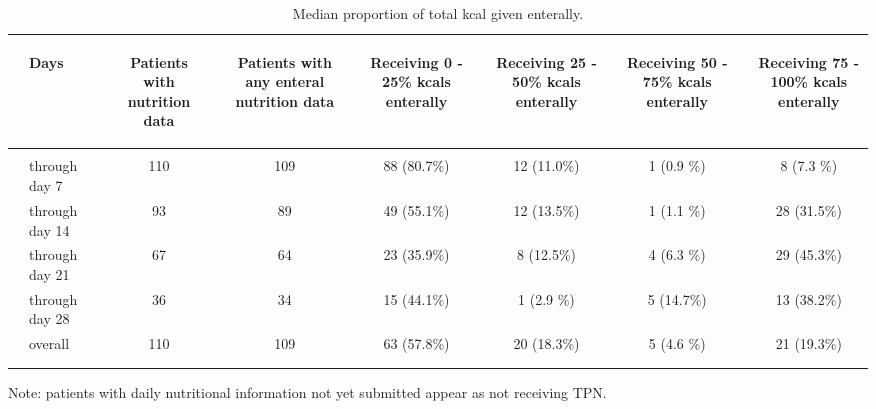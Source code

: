 \documentclass[dvips,10pt]{article}
\begin{document}
\begin{table}[t]
\caption
{ Median proportion of total kcal given enterally. }
\begin{center}
\begin{tabular}{ @{}l@{}
@{}l@{}@{}p{1.5em}@{}@{}c@{}@{}p{1.5em}@{}@{}c@{}@{}p{1.5em}@{}@{}c@{}@{}p{1.5em}@{}@{}c@{}@{}p{1.5em}@{}@{}c@{}@{}p{1.5em}@{}@{}c@{}
}
\hline

& \parbox{6em}{\begin{center}Days\end{center}} && \parbox{6em}{\begin{center}Patients with nutrition data\end{center}} && \parbox{6em}{\begin{center}Patients with any enteral nutrition data\end{center}} && \parbox{6em}{\begin{center}Receiving 0 - 25\% kcals enterally\end{center}} && \parbox{6em}{\begin{center}Receiving 25 - 50\% kcals enterally\end{center}} && \parbox{6em}{\begin{center}Receiving 50 - 75\% kcals enterally\end{center}} && \parbox{6em}{\begin{center}Receiving 75 - 100\% kcals enterally\end{center}} \\

\hline

\\
& through day 7 && 110 && 109 && 88 (80.7\%) && 12 (11.0\%) && 1 (0.9 \%) && 8 (7.3 \%) \\
& through day 14 && 93 && 89 && 49 (55.1\%) && 12 (13.5\%) && 1 (1.1 \%) && 28 (31.5\%) \\
& through day 21 && 67 && 64 && 23 (35.9\%) && 8 (12.5\%) && 4 (6.3 \%) && 29 (45.3\%) \\
& through day 28 && 36 && 34 && 15 (44.1\%) && 1 (2.9 \%) && 5 (14.7\%) && 13 (38.2\%) \\
& overall && 110 && 109 && 63 (57.8\%) && 20 (18.3\%) && 5 (4.6 \%) && 21 (19.3\%) \\
\\
\hline \\

\end{tabular}


\parbox{ 5in }{  Note: patients with daily nutritional information not yet submitted appear as not receiving TPN. } \\
 \vspace{1em}\end{center}
 \end{table}
\end{document}
